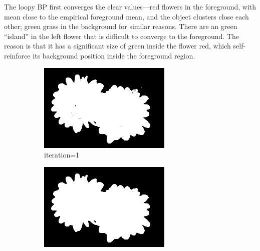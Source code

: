 \documentclass{article}
\begin{document}
The loopy BP first converges the clear values---red flowers in the foreground, with mean 
close to the empirical foreground mean, and the object clusters close each other; green 
grass in the background for similar reasons. There are an green ``island'' in the left
flower that is difficult to converge to the foreground. The reason is that it has a
significant size of green inside the flower red, which self-reinforce its background
position inside the foreground region.
%
\begin{figure}[t]
\captionsetup[subfigure]{labelformat=empty}
\centering
%
\begin{subfigure}[t]{0.19\textwidth}
\centering
\includegraphics[width=\textwidth]{./images/marginals_iter_1.png}
\vspace{-0.6cm}
\caption{iteration=1}
\end{subfigure}
\begin{subfigure}[t]{0.19\textwidth}
\centering
\includegraphics[width=\textwidth]{./images/marginals_iter_2.png}

\end{subfigure}
\end{figure}
\end{document}
